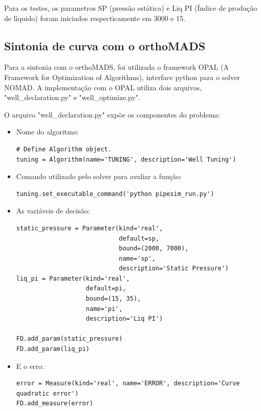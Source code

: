 Para os testes, os parametros SP (pressão estática) e Liq PI (Índice de produção de líquido) foram iniciados respecticamente em 3000 e 15.


\subsection{Sintonia de curva com o orthoMADS}
Para a sintonia com o orthoMADS, foi utilizada o framework OPAL (A Framework for Optimization of Algorithms), interface python para o solver NOMAD.
A implementação com o OPAL utiliza dois arquivos, "well\_declaration.py" e "well\_optimize.py".

O arquivo "well\_declaration.py" expõe os componentes do problema:

\begin{itemize}
\item Nome do algoritmo:
\begin{verbatim}
# Define Algorithm object.
tuning = Algorithm(name='TUNING', description='Well Tuning')
\end{verbatim}
\end{itemize}

\begin{itemize}
\item Comando utilizado pelo solver para avaliar a função:
\begin{verbatim}
tuning.set_executable_command('python pipesim_run.py')
\end{verbatim}
\end{itemize}


\begin{itemize}
\item As variáveis de decisão:
\begin{verbatim}
static_pressure = Parameter(kind='real', 
                            default=sp, 
                            bound=(2000, 7000),
                            name='sp', 
                            description='Static Pressure')
liq_pi = Parameter(kind='real', 
                   default=pi, 
                   bound=(15, 35),
                   name='pi', 
                   description='Liq PI')

FD.add_param(static_pressure)
FD.add_param(liq_pi)
\end{verbatim}
\end{itemize}

\begin{itemize}
\item E o erro:
\begin{verbatim}
error = Measure(kind='real', name='ERROR', description='Curve quadratic error')
FD.add_measure(error)
\end{verbatim}
\end{itemize}


